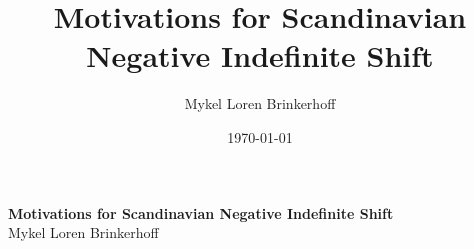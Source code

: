 \documentclass[12pt, letterpaper]{article}
\title{Motivations for Scandinavian Negative Indefinite Shift}
\author{Mykel Loren Brinkerhoff}
\date{\today}
\begin{document}
	
	
	
\begin{center}
	{\Large \textbf{Motivations for Scandinavian Negative Indefinite Shift}}\\
	\vspace{6pt}
	Mykel Loren Brinkerhoff\\
\end{center}
\thispagestyle{fancy}


\end{document}

